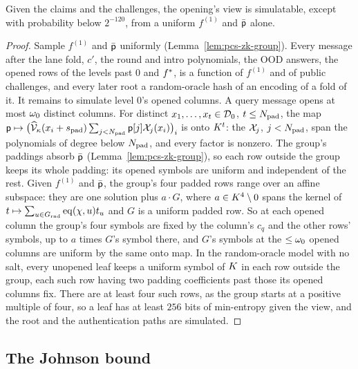 \begin{theorem}\label{thm:pcs-zk}
Given the claims and the challenges, the opening's view is simulatable, except with probability below $2^{-120}$, from a uniform $f^{(1)}$ and $\bar{\mathsf{p}}$ alone.
\end{theorem}
\begin{proof}
Sample $f^{(1)}$ and $\bar{\mathsf{p}}$ uniformly (Lemma~\ref{lem:pcs-zk-group}). Every message after the lane fold, $c'$, the round and intro polynomials, the OOD answers, the opened rows of the levels past $0$ and $f^{\ast}$, is a function of $f^{(1)}$ and of public challenges, and every later root a random-oracle hash of an encoding of a fold of it. It remains to simulate level $0$'s opened columns. A query message opens at most $\omega_0$ distinct columns. For distinct $x_1, \dots, x_t \in \mathcal{D}_0$, $t \le N_{\mathrm{pad}}$, the map $\mathsf{p} \mapsto \bigl(\widehat{\mathcal{V}}_{\kappa}(x_i + s_{\mathrm{pad}}) \sum_{j < N_{\mathrm{pad}}} \mathsf{p}[j] \mathcal{X}_j(x_i)\bigr)_i$ is onto $K^t$: the $\mathcal{X}_j$, $j < N_{\mathrm{pad}}$, span the polynomials of degree below $N_{\mathrm{pad}}$, and every factor is nonzero. The group's paddings absorb $\bar{\mathsf{p}}$ (Lemma~\ref{lem:pcs-zk-group}), so each row outside the group keeps its whole padding: its opened symbols are uniform and independent of the rest. Given $f^{(1)}$ and $\bar{\mathsf{p}}$, the group's four padded rows range over an affine subspace: they are one solution plus $a \cdot G$, where $a \in K^4 \setminus 0$ spans the kernel of $t \mapsto \sum_{u \in G_{\mathrm{rnd}}} \operatorname{eq}(\chi, u) t_u$ and $G$ is a uniform padded row. So at each opened column the group's four symbols are fixed by the column's $c_q$ and the other rows' symbols, up to $a$ times $G$'s symbol there, and $G$'s symbols at the $\le \omega_0$ opened columns are uniform by the same onto map. In the random-oracle model with no salt, every unopened leaf keeps a uniform symbol of $K$ in each row outside the group, each such row having two padding coefficients past those its opened columns fix. There are at least four such rows, as the group starts at a positive multiple of four, so a leaf has at least $256$ bits of min-entropy given the view, and the root and the authentication paths are simulated.
\end{proof}


\subsection{The Johnson bound}\label{app:johnson}

